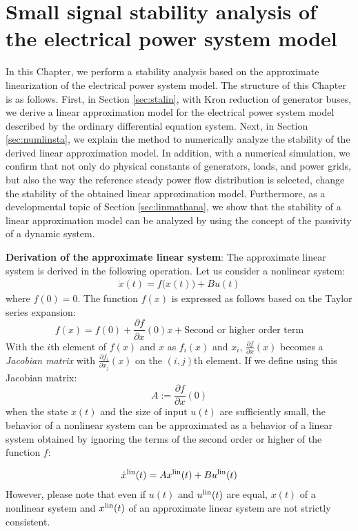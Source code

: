 \documentclass[tombow,dvipdfmx]{corona-a5-1.1}
\begin{document}
\chapter{Small signal stability analysis of the electrical power system model}\label{sec:staana}

In this Chapter, we perform a stability analysis based on the approximate linearization of the electrical power system model.
The structure of this Chapter is as follows. First, in Section \ref{sec:stalin}, with Kron reduction of generator buses, we derive a linear approximation model for the electrical power system model described by the ordinary differential equation system.
Next, in Section \ref{sec:numlinsta}, we explain the method to numerically analyze the stability of the derived linear approximation model.
In addition, with a numerical simulation, we confirm that not only do physical constants of generators, loads, and power grids, but also the way the reference steady power flow distribution is selected, change the stability of the obtained linear approximation model.
Furthermore, as a developmental topic of Section \ref{sec:linmathana}, we show that the stability of a linear approximation model can be analyzed by using the concept of the passivity of a dynamic system.


\begin{COLUMN}
\noindent \textbf{Derivation of the approximate linear system}:
The approximate linear system is derived in the following operation. Let us consider a nonlinear system:
\begin{align*}
\dot{x}(t) = f\bigl(x(t)\bigr) + Bu(t) 
\end{align*}
where $f(0)=0$. The function $f(x)$ is expressed as follows based on the Taylor series expansion:
\[
f(x)=f(0) + \frac{\partial f}{\partial x} (0) x + \mbox{Second or higher order term}
\]
With the $i$th element of $f(x)$ and $x$ as $f_i(x)$ and $x_i$, $\tfrac{\partial f}{\partial x}(x)$ becomes a \emph{Jacobian matrix} with $\tfrac{\partial f_i}{\partial x_j}(x)$ on the $(i,j)$th element.
If we define using this Jacobian matrix:
\[
A:=\frac{\partial f}{\partial x} (0)
\]
when the state $x(t)$ and the size of input $u(t)$ are sufficiently small, the behavior of a nonlinear system can be approximated as a behavior of a linear system obtained by ignoring the terms of the second order or higher of the function $f$:

\begin{align*}
\dot{x}^{\rm lin}(t) = Ax^{\rm lin}(t) + Bu^{\rm lin}(t) 
\end{align*}
However, please note that even if $u(t)$ and $u^{\rm lin}(t)$ are equal, $x(t)$ of a nonlinear system and $x^{\rm lin}(t)$ of an approximate linear system are not strictly consistent.
\end{COLUMN}
\end{document}
